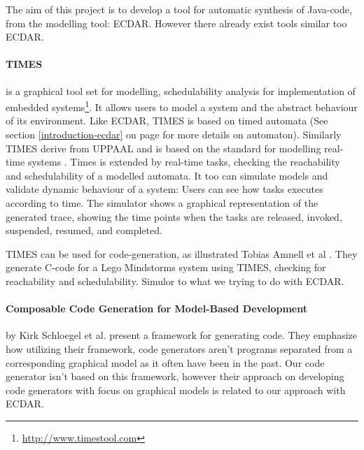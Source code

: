 The aim of this project is to develop a tool for automatic synthesis of Java-code, from the modelling tool: ECDAR. However there already exist tools similar too ECDAR.

\paragraph{TIMES} is a graphical tool set for modelling, schedulability analysis for implementation of embedded systems\footnote{\url{http://www.timestool.com}}. It allows users to model a system and the abstract behaviour of its environment. 
Like ECDAR, TIMES is based on timed automata (See section \ref{introduction-ecdar} on page \pageref{introduction-ecdar} for more details on automaton). Similarly TIMES derive from UPPAAL and is based on the standard for modelling real-time systems \cite{Alur1994:183}.
Times is extended by real-time tasks, checking the reachability and schedulability of a modelled automata. It too can simulate models and validate dynamic behaviour of a system: Users can see how tasks executes according to time. The simulator shows a graphical representation of the generated trace, showing the time points when the tasks are released, invoked, suspended, resumed, and completed.

TIMES can be used for code-generation, as illustrated Tobias Amnell et al \cite{Amnell:2002:CST:779110.779112}. They generate C-code for a Lego Mindstorms system using TIMES, checking for reachability and schedulability. Simulor to what we trying to do with ECDAR. 





\paragraph{Composable Code Generation for Model-Based Development}
by Kirk Schloegel et al. present a framework for generating
code\cite{composable-code-generation}. They emphasize how utilizing their
framework, code generators aren't programs separated from a corresponding
graphical model as it often have been in the past. Our code generator isn't
based on this framework, however their approach on developing code generators
with focus on graphical models is related to our approach with ECDAR.

